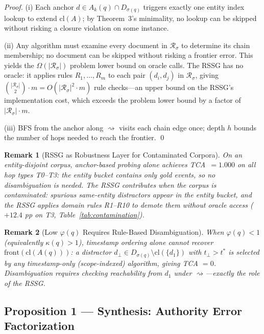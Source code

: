 \documentclass[11pt]{article}
\newtheorem{remark}{Remark}
\begin{document}
\begin{proof}
(i) Each anchor $d \in A_k(q) \cap D_{\sigma(q)}$ triggers exactly one entity index lookup to extend $\mathrm{cl}(A)$; by Theorem~3's minimality, no lookup can be skipped without risking a closure violation on some instance.

(ii) Any algorithm must examine every document in $\mathcal{R}_\sigma$ to determine its chain membership; no document can be skipped without risking a frontier error. This yields the $\Omega(|\mathcal{R}_\sigma|)$ problem lower bound on oracle calls. The RSSG has no oracle: it applies rules $R_1,\ldots,R_m$ to each pair $(d_i,d_j)$ in $\mathcal{R}_\sigma$, giving $\binom{|\mathcal{R}_\sigma|}{2} \cdot m = O(|\mathcal{R}_\sigma|^2 \cdot m)$ rule checks---an upper bound on the RSSG's implementation cost, which exceeds the problem lower bound by a factor of $|\mathcal{R}_\sigma| \cdot m$.

(iii) BFS from the anchor along $\rightsquigarrow$ visits each chain edge once; depth $h$ bounds the number of hops needed to reach the frontier. \qed
\end{proof}

\begin{remark}[RSSG as Robustness Layer for Contaminated Corpora]
\label{rem:anchor}
On an entity-disjoint corpus, anchor-based probing alone achieves TCA~$= 1.000$ on all hop types T0--T3: the entity bucket contains only gold events, so no disambiguation is needed. The RSSG contributes when the corpus is \emph{contaminated}: spurious same-entity distractors appear in the entity bucket, and the RSSG applies domain rules R1--R10 to demote them without oracle access ($+12.4$ pp on T3, Table~\ref{tab:contamination}).
\end{remark}

\begin{remark}[Low $\varphi(q)$ Requires Rule-Based Disambiguation]
\label{rem:ambiguity}
When $\varphi(q) < 1$ (equivalently $\kappa(q) > 1$), timestamp ordering alone cannot recover $\mathrm{front}(\mathrm{cl}(A(q)))$: a distractor $d_\perp \in D_{\sigma(q)} \setminus \mathrm{cl}(\{d_1\})$ with $t_\perp > t^*$ is selected by any timestamp-only (scope-indexed) algorithm, giving TCA $= 0$. Disambiguation requires checking reachability from $d_1$ under $\rightsquigarrow$---exactly the role of the RSSG.
\end{remark}

\subsection{Proposition 1 — Synthesis: Authority Error Factorization}
\end{document}
